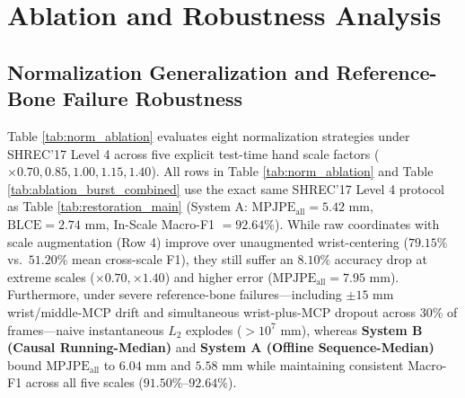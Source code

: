 \documentclass[10pt,twocolumn]{article}
\begin{document}
\section{Ablation and Robustness Analysis}

\subsection{Normalization Generalization and Reference-Bone Failure Robustness}
Table \ref{tab:norm_ablation} evaluates eight normalization strategies under SHREC'17 Level 4 across five explicit test-time hand scale factors ($\times 0.70, 0.85, 1.00, 1.15, 1.40$). All rows in Table \ref{tab:norm_ablation} and Table \ref{tab:ablation_burst_combined} use the exact same SHREC'17 Level 4 protocol as Table \ref{tab:restoration_main} (System A: $\text{MPJPE}_{\text{all}} = 5.42\text{ mm}$, $\text{BLCE} = 2.74\text{ mm}$, In-Scale Macro-F1 $= 92.64\%$). While raw coordinates with scale augmentation (Row 4) improve over unaugmented wrist-centering ($79.15\%$ vs.\ $51.20\%$ mean cross-scale F1), they still suffer an $8.10\%$ accuracy drop at extreme scales ($\times 0.70, \times 1.40$) and higher error ($\text{MPJPE}_{\text{all}} = 7.95\text{ mm}$). Furthermore, under severe reference-bone failures---including $\pm 15\text{ mm}$ wrist/middle-MCP drift and simultaneous wrist-plus-MCP dropout across $30\%$ of frames---naive instantaneous $L_2$ explodes ($>10^7\text{ mm}$), whereas \textbf{System B (Causal Running-Median)} and \textbf{System A (Offline Sequence-Median)} bound $\text{MPJPE}_{\text{all}}$ to $6.04\text{ mm}$ and $5.58\text{ mm}$ while maintaining consistent Macro-F1 across all five scales ($91.50\%\text{--}92.64\%$).
\end{document}
